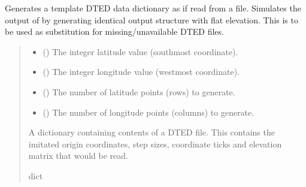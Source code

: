 \documentclass[letterpaper,10pt,english]{sphinxmanual}
\begin{document}
\begin{fulllineitems}
\label{\detokenize{modules/earth/dted:qnav.earth.dted.get_template_dted_data}}
\pysigstartsignatures
{}
\pysigstopsignatures
\sphinxAtStartPar
Generates a template DTED data dictionary as if read from a file.
Simulates the output of  by generating
identical output structure with flat elevation. This is to be used as
substitution for missing/unavailable DTED files.
\begin{quote}\begin{description}
\begin{itemize}
\item {} 
\sphinxAtStartPar
{} () \textendash{} The integer latitude value (south\sphinxhyphen{}most coordinate).

\item {} 
\sphinxAtStartPar
{} () \textendash{} The integer longitude value (west\sphinxhyphen{}most coordinate).

\item {} 
\sphinxAtStartPar
{} () \textendash{} The number of latitude points (rows) to generate.

\item {} 
\sphinxAtStartPar
{} () \textendash{} The number of longitude points (columns) to generate.

\end{itemize}

\sphinxAtStartPar
A dictionary containing contents of a DTED file.
This contains the imitated origin coordinates, step sizes,
coordinate ticks and elevation matrix that would be read.

\sphinxAtStartPar
dict

\end{description}\end{quote}

\end{fulllineitems}
\end{document}
